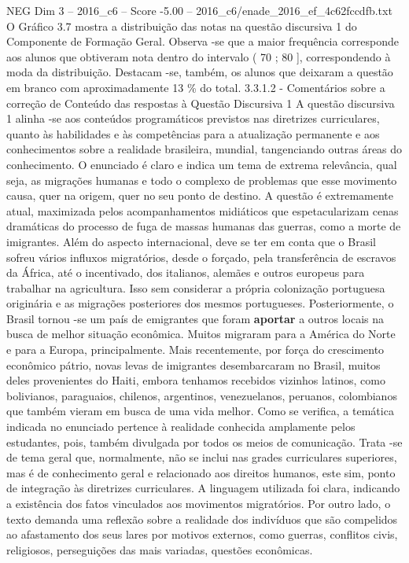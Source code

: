 \begin{textsample}{NEG Dim 3 – 2016\_c6 – Score -5.00 – 2016\_c6/enade\_2016\_ef\_4c62fccdfb.txt}
O Gráfico 3.7 mostra a distribuição das notas na questão discursiva 1 do Componente de Formação Geral.
Observa -se que a maior frequência corresponde aos alunos que obtiveram nota dentro do intervalo ( 70 ; 80 ], correspondendo à moda da distribuição.
Destacam -se, também, os alunos que deixaram a questão em branco com aproximadamente 13 \% do total. 3.3.1.2 - Comentários sobre a correção de Conteúdo das respostas à Questão Discursiva 1 A questão discursiva 1 alinha -se aos conteúdos programáticos previstos nas diretrizes curriculares, quanto às habilidades e às competências para a atualização permanente e aos conhecimentos sobre a realidade brasileira, mundial, tangenciando outras áreas do conhecimento.
O enunciado é claro e indica um tema de extrema relevância, qual seja, as migrações humanas e todo o complexo de problemas que esse movimento causa, quer na origem, quer no seu ponto de destino.
A questão é extremamente atual, maximizada pelos acompanhamentos midiáticos que espetacularizam cenas dramáticas do processo de fuga de massas humanas das guerras, como a morte de imigrantes.
Além do aspecto internacional, deve se ter em conta que o Brasil sofreu vários influxos migratórios, desde o forçado, pela transferência de escravos da África, até o incentivado, dos italianos, alemães e outros europeus para trabalhar na agricultura.
Isso sem considerar a própria colonização portuguesa originária e as migrações posteriores dos mesmos portugueses.
Posteriormente, o Brasil tornou -se um país de emigrantes que foram \textbf{aportar} a outros locais na busca de melhor situação econômica.
Muitos migraram para a América do Norte e para a Europa, principalmente.
Mais recentemente, por força do crescimento econômico pátrio, novas levas de imigrantes desembarcaram no Brasil, muitos deles provenientes do Haiti, embora tenhamos recebidos vizinhos latinos, como bolivianos, paraguaios, chilenos, argentinos, venezuelanos, peruanos, colombianos que também vieram em busca de uma vida melhor.
Como se verifica, a temática indicada no enunciado pertence à realidade conhecida amplamente pelos estudantes, pois, também divulgada por todos os meios de comunicação.
Trata -se de tema geral que, normalmente, não se inclui nas grades curriculares superiores, mas é de conhecimento geral e relacionado aos direitos humanos, este sim, ponto de integração às diretrizes curriculares.
A linguagem utilizada foi clara, indicando a existência dos fatos vinculados aos movimentos migratórios.
Por outro lado, o texto demanda uma reflexão sobre a realidade dos indivíduos que são compelidos ao afastamento dos seus lares por motivos externos, como guerras, conflitos civis, religiosos, perseguições das mais variadas, questões econômicas.

\end{textsample}

